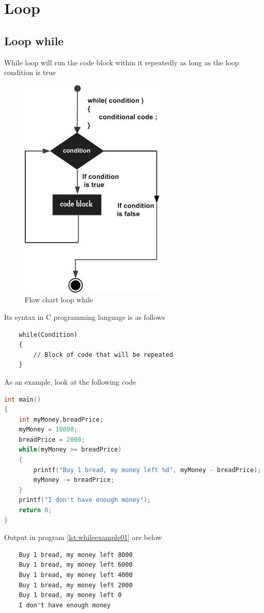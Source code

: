 \section{Loop}
\subsection{Loop while}
While loop will run the code block within it repeatedly as long as the loop condition is true


\begin{figure}[H]
	\centering
	\includegraphics[width=0.4\linewidth]{P2/img/whileloop.png}
	\caption{Flow chart loop while}
	\label{fig:whileloop}
\end{figure}

Its syntax in C programming language is as follows
\begin{verbatim}
    while(Condition)
    {
        // Block of code that will be repeated
    }
\end{verbatim}

As an example, look at the following code
\begin{lstlisting}[language=c,caption = While implementation example,label=lst:whileexample01]
int main()
{
	int myMoney,breadPrice;
	myMoney = 10000;
	breadPrice = 2000;
	while(myMoney >= breadPrice)
	{
	    printf("Buy 1 bread, my money left %d", myMoney - breadPrice);
	    myMoney -= breadPrice;
	}
	printf("I don't have enough money");
	return 0;
}
\end{lstlisting}
Output in program \ref{lst:whileexample01} are below
\begin{verbatim}
    Buy 1 bread, my money left 8000
    Buy 1 bread, my money left 6000
    Buy 1 bread, my money left 4000
    Buy 1 bread, my money left 2000
    Buy 1 bread, my money left 0
    I don't have enough money
\end{verbatim}

